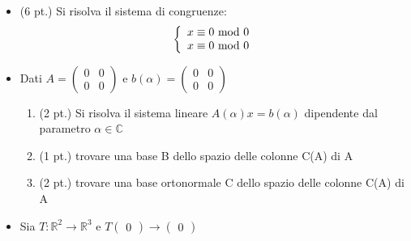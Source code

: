 \documentclass[12pt,a4paper]{article}
\begin{document}
\begin{itemize}[label=$\circ$]

    \item (6 pt.) Si risolva il sistema di congruenze:
    \[ 
        \left\{ 
            \begin{array}{rcl} 
                x \equiv 0 $ mod $ 0 \\
                x \equiv 0 $ mod $ 0 
            \end{array} 
        \right . 
    \]

    \item Dati 
    \(
        A =
        \begin{pmatrix}
            0 & 0 \\
            0 & 0
        \end{pmatrix}
    \)
        e 
    \(
        b(\alpha) =
        \begin{pmatrix}
            0 & 0 \\
            0 & 0
        \end{pmatrix}
    \)

    \begin{enumerate} 
        \item (2 pt.) Si risolva il sistema lineare \( A(\alpha)x = b(\alpha) \) dipendente dal parametro $\alpha \in \mathbb{C}$  

        \item (1 pt.) trovare una base B dello spazio delle colonne C(A) di A 

        \item (2 pt.) trovare una base ortonormale C dello spazio delle colonne C(A) di A 
    \end{enumerate}   

    \item Sia 
        \( 
            T: \mathbb{R}^2 \rightarrow \mathbb{R}^3 
        \) 
        e 
        \( 
            T 
            \begin{pmatrix} 
                0 
            \end{pmatrix} 
            \rightarrow 
            \begin{pmatrix} 
                0 
            \end{pmatrix}  
        \)


\end{itemize}
\end{document}
